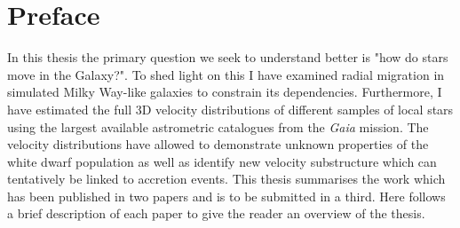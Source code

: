 \section*{Preface}
In this thesis the primary question we seek to understand better is "how do stars move in the Galaxy?". To shed light on this I have examined radial migration in simulated Milky Way-like galaxies to constrain its dependencies. Furthermore, I have estimated the full 3D velocity distributions of different samples of local stars using the largest available astrometric catalogues from the \textit{Gaia} mission. The velocity distributions have allowed to demonstrate unknown properties of the white dwarf population as well as identify new velocity substructure which can tentatively be linked to accretion events.\newline
\newline
This thesis summarises the work which has been published in two papers and is to be submitted in a third. Here follows a brief description of each paper to give the reader an overview of the thesis.

